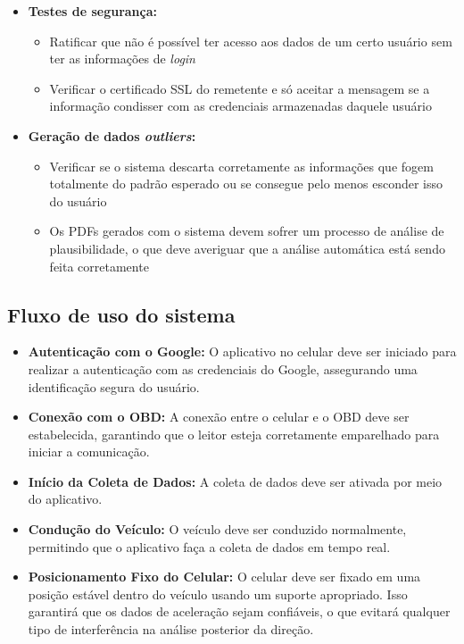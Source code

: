\begin{itemize}
    \item \textbf{Testes de segurança:} 
    \begin{itemize}
        \item Ratificar que não é possível ter acesso aos dados de um certo usuário sem ter as informações de \textit{login}
        \item Verificar o certificado SSL do remetente e só aceitar a mensagem se a informação condisser com as credenciais armazenadas daquele usuário
    \end{itemize}
    
    \item \textbf{Geração de dados \textit{outliers}:}
    \begin{itemize}
        \item Verificar se o sistema descarta corretamente as informações que fogem totalmente do padrão esperado ou se consegue pelo menos esconder isso do usuário
        \item Os PDFs gerados com o sistema devem sofrer um processo de análise de plausibilidade, o que deve averiguar que a análise automática está sendo feita corretamente
    \end{itemize}
    
\end{itemize}


\subsection{Fluxo de uso do sistema}

    \begin{itemize}
    \item \textbf{Autenticação com o Google:}
    O aplicativo no celular deve ser iniciado para realizar a autenticação com as credenciais do Google, assegurando uma identificação segura do usuário.

    \item \textbf{Conexão com o OBD:}
    A conexão entre o celular e o OBD deve ser estabelecida, garantindo que o leitor esteja corretamente emparelhado para iniciar a comunicação.

    \item \textbf{Início da Coleta de Dados:}
    A coleta de dados deve ser ativada por meio do aplicativo.

    \item \textbf{Condução do Veículo:}
    O veículo deve ser conduzido normalmente, permitindo que o aplicativo faça a coleta de dados em tempo real.

    \item \textbf{Posicionamento Fixo do Celular:}
    O celular deve ser fixado em uma posição estável dentro do veículo usando um suporte apropriado. Isso garantirá que os dados de aceleração sejam confiáveis, o que evitará qualquer tipo de interferência na análise posterior da direção.
\end{itemize}


